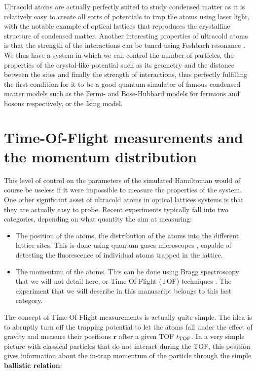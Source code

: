 Ultracold atoms are actually perfectly suited to study condensed matter as it is relatively easy to create all sorts of potentials to trap the atoms using laser light, with the notable example of optical lattices \cite{bloch2005ultracold} that reproduces the crystalline structure of condensed matter. Another interesting properties of ultracold atoms is that the strength of the interactions can be tuned using Feshbach resonance \cite{chin2010feshbach,feshbach1958unified}. We thus have a system in which we can control the number of particles, the properties of the crystal-like potential such as its geometry and the distance between the sites and finally the strength of interactions, thus perfectly fulfilling the first condition for it to be a good quantum simulator of famous condensed matter models such as the Fermi- and Bose-Hubbard models for fermions and bosons respectively, or the Ising model. 

\section*{Time-Of-Flight measurements and the momentum distribution}

This level of control on the parameters of the simulated Hamiltonian would of course be useless if it were impossible to measure the properties of the system. One other significant asset of ultracold atoms in optical lattices systems is that they are actually easy to probe. Recent experiments typically fall into two categories, depending on what quantity the aim at measuring:

\begin{itemize}
 \item The position of the atoms, \ie the distribution of the atoms into the different lattice sites. This is done using quantum gases microscopes \cite{bakr2009quantum,cheuk2015quantum,sherson2010single}, capable of detecting the fluorescence of individual atoms trapped in the lattice.
 \item The momentum of the atoms. This can be done using Bragg spectroscopy \cite{stenger1999} that we will not detail here, or Time-Of-Flight (TOF) techniques \cite{greiner2002quantum,spielman2008condensate,xu2006}. The experiment that we will describe in this manuscript belongs to this last category.
\end{itemize}

The concept of Time-Of-Flight measurements is actually quite simple. The idea is to abruptly turn off the trapping potential to let the atoms fall under the effect of gravity and measure their positions $\bm{r}$ after a given TOF $t_{\rm{TOF}}$. In a very simple picture with classical particles that do not interact during the TOF, this position gives information about the in-trap momentum of the particle through the simple \textbf{ballistic relation}:

